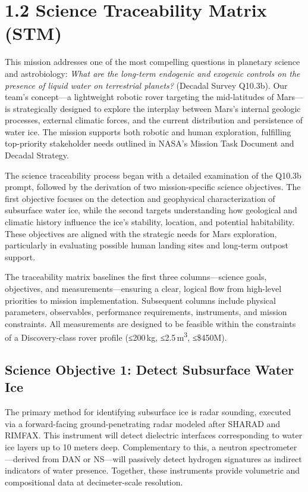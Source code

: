 \section*{1.2 Science Traceability Matrix (STM)}

This mission addresses one of the most compelling questions in planetary science and astrobiology: \textit{What are the long-term endogenic and exogenic controls on the presence of liquid water on terrestrial planets?} (Decadal Survey Q10.3b). Our team’s concept—a lightweight robotic rover targeting the mid-latitudes of Mars—is strategically designed to explore the interplay between Mars’s internal geologic processes, external climatic forces, and the current distribution and persistence of water ice. The mission supports both robotic and human exploration, fulfilling top-priority stakeholder needs outlined in NASA’s Mission Task Document and Decadal Strategy.

The science traceability process began with a detailed examination of the Q10.3b prompt, followed by the derivation of two mission-specific science objectives. The first objective focuses on the detection and geophysical characterization of subsurface water ice, while the second targets understanding how geological and climatic history influence the ice’s stability, location, and potential habitability. These objectives are aligned with the strategic needs for Mars exploration, particularly in evaluating possible human landing sites and long-term outpost support.

The traceability matrix baselines the first three columns—science goals, objectives, and measurements—ensuring a clear, logical flow from high-level priorities to mission implementation. Subsequent columns include physical parameters, observables, performance requirements, instruments, and mission constraints. All measurements are designed to be feasible within the constraints of a Discovery-class rover profile (≤200 kg, ≤2.5 m\textsuperscript{3}, ≤\$450M).

\subsection*{Science Objective 1: Detect Subsurface Water Ice}

The primary method for identifying subsurface ice is radar sounding, executed via a forward-facing ground-penetrating radar modeled after SHARAD and RIMFAX. This instrument will detect dielectric interfaces corresponding to water ice layers up to 10 meters deep. Complementary to this, a neutron spectrometer—derived from DAN or NS—will passively detect hydrogen signatures as indirect indicators of water presence. Together, these instruments provide volumetric and compositional data at decimeter-scale resolution.

